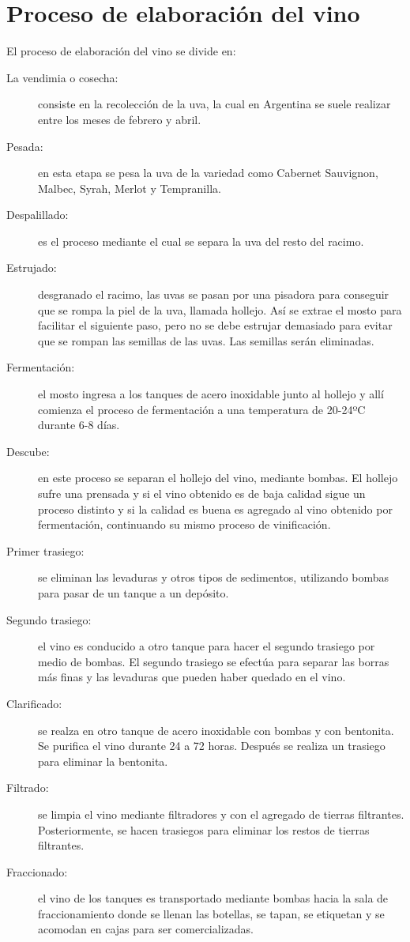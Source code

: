 \section{Proceso de elaboración del vino}
El proceso de elaboración del vino se divide en:
\begin{description}
  \item[La vendimia o cosecha:] consiste en la recolección de la uva, la cual en Argentina se suele realizar entre los meses de febrero y abril.
  \item[Pesada:] en esta etapa se pesa la uva de la variedad como Cabernet Sauvignon, Malbec, Syrah, Merlot y Tempranilla.
  \item[Despalillado:] es el proceso mediante el cual se separa la uva del resto del racimo.
  \item[Estrujado:] desgranado el racimo, las uvas se pasan por una pisadora para conseguir que se rompa la piel de la uva, llamada hollejo. Así se extrae el mosto para facilitar el siguiente paso, pero no se debe estrujar demasiado para evitar que se rompan las semillas de las uvas. Las semillas serán eliminadas.
  \item[Fermentación:] el mosto ingresa a los tanques de acero inoxidable junto al hollejo y allí comienza el proceso de fermentación a una temperatura de 20-24ºC durante 6-8 días.
  \item[Descube:] en este proceso se separan el hollejo del vino, mediante bombas. El hollejo sufre una prensada y si el vino obtenido es de baja calidad sigue un proceso distinto y si la calidad es buena es agregado al vino obtenido por fermentación, continuando su mismo proceso de vinificación.
  \item[Primer trasiego:] se eliminan las levaduras y otros tipos de sedimentos, utilizando bombas para pasar de un tanque a un depósito.
  \item[Segundo trasiego:] el vino es conducido a otro tanque para hacer el segundo trasiego por medio de bombas. El segundo trasiego se efectúa para separar las borras más finas y las levaduras que pueden haber quedado en el vino.
  \item[Clarificado:] se realza en otro tanque de acero inoxidable con bombas y con bentonita. Se purifica el vino durante 24 a 72 horas. Después se realiza un trasiego para eliminar la bentonita.
  \item[Filtrado:] se limpia el vino mediante filtradores y con el agregado de tierras filtrantes. Posteriormente, se hacen trasiegos para eliminar los restos de tierras filtrantes.
  \item[Fraccionado:] el vino de los tanques es transportado mediante bombas hacia la sala de fraccionamiento donde se llenan las botellas, se tapan, se etiquetan y se acomodan en cajas para ser comercializadas.
\end{description}

